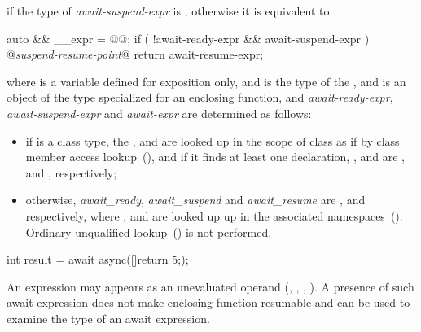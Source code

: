 if the type of \textit{await-suspend-expr} is , otherwise it is equivalent to

\begin{codeblock}
{
  auto && __expr = @@;
  if ( !await-ready-expr && await-suspend-expr ) {
    @\textit{suspend-resume-point}@
  }
  return await-resume-expr;
}
\end{codeblock}

where  is a variable defined for
exposition only, and  is the type of the
, and 
is an object of the  type specialized for an enclosing function,
and \textit{await-ready-expr}, \textit{await-suspend-expr} and \textit{await-expr} are
determined as follows:

\begin{itemize}
	\item if  is a class type, the 
	,  and  are 
	looked up in the scope of class 
	as if by class member access lookup~(), and if it finds at least one declaration, 
	,  and  are
	,  and ,
	respectively;
	
	\item otherwise, \textit{await_ready}, \textit{await_suspend} and \textit{await_resume} are 
	,  and  
	respectively, where 
	,  and  are 
	looked up up in the associated namespaces~().
	\enternote Ordinary unqualified lookup~() is not
	performed. \exitnote
\end{itemize}

\enterexample
\begin{codeblock}
	int result = await async([]{return 5;});
\end{codeblock}
\exitexample%

\pnum
An  expression may appears as an unevaluated operand (, , , ). A presence of such await expression does not make enclosing function resumable and can be used to examine the type of an await expression.
 
